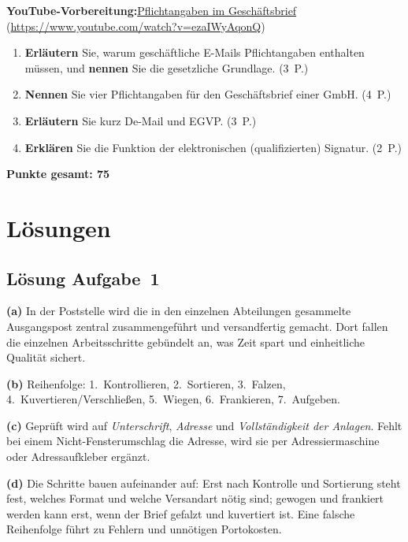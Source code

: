 \documentclass[11pt, a4paper]{article}
\begin{document}
\noindent\textbf{\color{bfwAccent}YouTube-Vorbereitung:}\enspace \href{https://www.youtube.com/watch?v=ezaIWyAqonQ}{Pflichtangaben im Geschäftsbrief} (\url{https://www.youtube.com/watch?v=ezaIWyAqonQ})

\medskip
\begin{enumerate}[label=(\alph*)]
  \item \textbf{Erläutern} Sie, warum geschäftliche E-Mails Pflichtangaben enthalten müssen, und \textbf{nennen} Sie die gesetzliche Grundlage. \hfill (3~P.)
  \item \textbf{Nennen} Sie vier Pflichtangaben für den Geschäftsbrief einer GmbH. \hfill (4~P.)
  \item \textbf{Erläutern} Sie kurz De-Mail und EGVP. \hfill (3~P.)
  \item \textbf{Erklären} Sie die Funktion der elektronischen (qualifizierten) Signatur. \hfill (2~P.)
\end{enumerate}

\vspace{1em}
\noindent\textbf{Punkte gesamt: 75}

\newpage

\section{Lösungen}\label{loesungen}

\subsection*{Lösung Aufgabe~1}
\begin{loesung}
\textbf{(a)} In der Poststelle wird die in den einzelnen Abteilungen gesammelte
Ausgangspost zentral zusammengeführt und versandfertig gemacht. Dort fallen die einzelnen
Arbeitsschritte gebündelt an, was Zeit spart und einheitliche Qualität sichert.

\textbf{(b)} Reihenfolge: 1.~Kontrollieren, 2.~Sortieren, 3.~Falzen,
4.~Kuvertieren/Verschließen, 5.~Wiegen, 6.~Frankieren, 7.~Aufgeben.

\textbf{(c)} Geprüft wird auf \emph{Unterschrift}, \emph{Adresse} und \emph{Vollständigkeit
der Anlagen}. Fehlt bei einem Nicht-Fensterumschlag die Adresse, wird sie per
Adressiermaschine oder Adressaufkleber ergänzt.

\textbf{(d)} Die Schritte bauen aufeinander auf: Erst nach Kontrolle und Sortierung steht
fest, welches Format und welche Versandart nötig sind; gewogen und frankiert werden kann
erst, wenn der Brief gefalzt und kuvertiert ist. Eine falsche Reihenfolge führt zu
Fehlern und unnötigen Portokosten.
\end{loesung}
\end{document}
